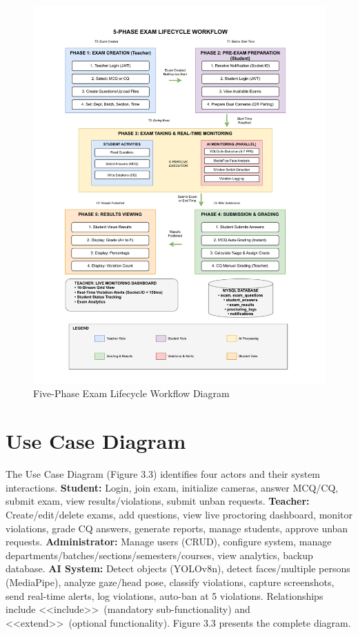 \begin{figure}[ht]
    \centering
    \includegraphics[width=\textwidth]{Chap3/workflow}
    \caption{Five-Phase Exam Lifecycle Workflow Diagram}
    \label{fig:workflow}
\end{figure}

\section{Use Case Diagram}

The Use Case Diagram (Figure 3.3) identifies four actors and their system interactions. \textbf{Student:} Login, join exam, initialize cameras, answer MCQ/CQ, submit exam, view results/violations, submit unban requests. \textbf{Teacher:} Create/edit/delete exams, add questions, view live proctoring dashboard, monitor violations, grade CQ answers, generate reports, manage students, approve unban requests. \textbf{Administrator:} Manage users (CRUD), configure system, manage departments/batches/sections/semesters/courses, view analytics, backup database. \textbf{AI System:} Detect objects (YOLOv8n), detect faces/multiple persons (MediaPipe), analyze gaze/head pose, classify violations, capture screenshots, send real-time alerts, log violations, auto-ban at 5 violations. Relationships include \textless\textless include\textgreater\textgreater~(mandatory sub-functionality) and \textless\textless extend\textgreater\textgreater~(optional functionality). Figure 3.3 presents the complete diagram.

